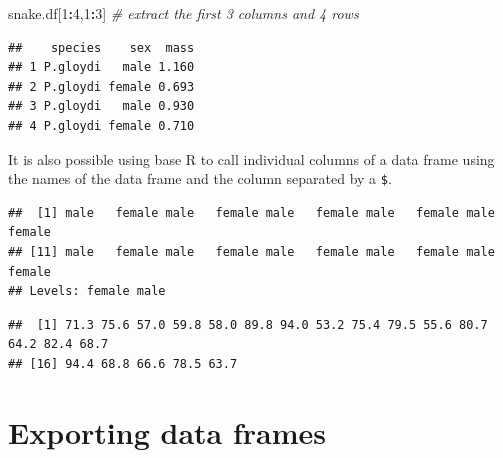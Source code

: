 \documentclass[
]{book}
\newenvironment{Shaded}{\begin{snugshade}}{\end{snugshade}}
\newcommand{\CommentTok}[1]{\textcolor[rgb]{0.56,0.35,0.01}{\textit{#1}}}
\newcommand{\DecValTok}[1]{\textcolor[rgb]{0.00,0.00,0.81}{#1}}
\newcommand{\NormalTok}[1]{#1}
\newcommand{\SpecialCharTok}[1]{\textcolor[rgb]{0.81,0.36,0.00}{\textbf{#1}}}
\begin{document}
\begin{Shaded}
\begin{Highlighting}[]
\NormalTok{snake.df[}\DecValTok{1}\SpecialCharTok{:}\DecValTok{4}\NormalTok{,}\DecValTok{1}\SpecialCharTok{:}\DecValTok{3}\NormalTok{]  }\CommentTok{\# extract the first 3 columns and 4 rows}
\end{Highlighting}
\end{Shaded}

\begin{verbatim}
##    species    sex  mass
## 1 P.gloydi   male 1.160
## 2 P.gloydi female 0.693
## 3 P.gloydi   male 0.930
## 4 P.gloydi female 0.710
\end{verbatim}

It is also possible using base R to call individual columns of a data frame using the names of the data frame and the column separated by a \texttt{\$}.

\begin{Shaded}
\end{Shaded}

\begin{verbatim}
##  [1] male   female male   female male   female male   female male   female
## [11] male   female male   female male   female male   female male   female
## Levels: female male
\end{verbatim}

\begin{Shaded}
\end{Shaded}

\begin{verbatim}
##  [1] 71.3 75.6 57.0 59.8 58.0 89.8 94.0 53.2 75.4 79.5 55.6 80.7 64.2 82.4 68.7
## [16] 94.4 68.8 66.6 78.5 63.7
\end{verbatim}

\hypertarget{exporting-data-frames}{%
\section{Exporting data frames}\label{exporting-data-frames}}
\end{document}

